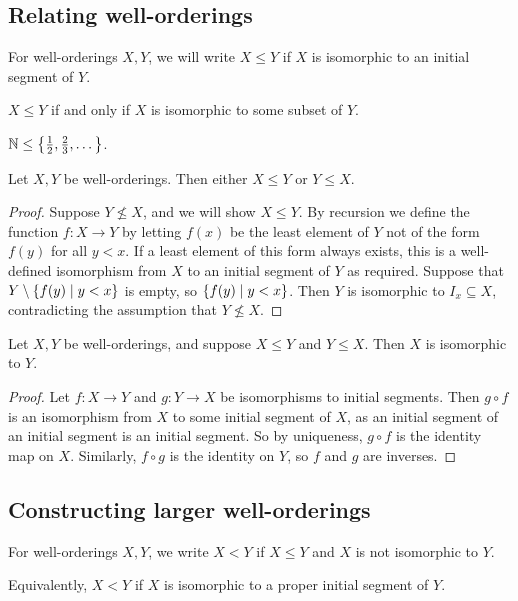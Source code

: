 \subsection{Relating well-orderings}
\begin{definition}
    For well-orderings \( X, Y \), we will write \( X \leq Y \) if \( X \) is isomorphic to an initial segment of \( Y \).
\end{definition}
\( X \leq Y \) if and only if \( X \) is isomorphic to some subset of \( Y \).
\begin{example}
    \( \mathbb N \leq \qty{\frac{1}{2}, \frac{2}{3}, \dots} \).
\end{example}
\begin{proposition}
    Let \( X, Y \) be well-orderings.
    Then either \( X \leq Y \) or \( Y \leq X \).
\end{proposition}
\begin{proof}
    Suppose \( Y \not\leq X \), and we will show \( X \leq Y \).
    By recursion we define the function \( f \colon X \to Y \) by letting \( f(x) \) be the least element of \( Y \) not of the form \( f(y) \) for all \( y < x \).
    If a least element of this form always exists, this is a well-defined isomorphism from \( X \) to an initial segment of \( Y \) as required.
    Suppose that \( Y \setminus \qty{f(y) \mid y < x} \) is empty, so \( \qty{f(y) \mid y < x} \).
    Then \( Y \) is isomorphic to \( I_x \subseteq X \), contradicting the assumption that \( Y \not\leq X \).
\end{proof}
\begin{proposition}
    Let \( X, Y \) be well-orderings, and suppose \( X \leq Y \) and \( Y \leq X \).
    Then \( X \) is isomorphic to \( Y \).
\end{proposition}
\begin{proof}
    Let \( f \colon X \to Y \) and \( g \colon Y \to X \) be isomorphisms to initial segments.
    Then \( g \circ f \) is an isomorphism from \( X \) to some initial segment of \( X \), as an initial segment of an initial segment is an initial segment.
    So by uniqueness, \( g \circ f \) is the identity map on \( X \).
    Similarly, \( f \circ g \) is the identity on \( Y \), so \( f \) and \( g \) are inverses.
\end{proof}

\subsection{Constructing larger well-orderings}
\begin{definition}
    For well-orderings \( X, Y \), we write \( X < Y \) if \( X \leq Y \) and \( X \) is not isomorphic to \( Y \).
\end{definition}
Equivalently, \( X < Y \) if \( X \) is isomorphic to a proper initial segment of \( Y \).

